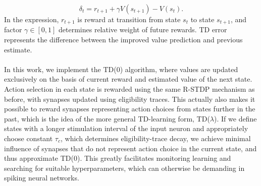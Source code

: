 \documentclass[a4paper,12pt,openright]{book}
\begin{document}
\[
\delta_t = r_{t+1} + \gamma V(s_{t+1}) - V(s_t).
\]
\noindent In the expression, \(r_{t+1}\) is reward at transition from state \(s_t\) to state \(s_{t+1}\), and factor \(\gamma \in [0,1]\) determines relative weight of future rewards. TD error represents the difference between the improved value prediction and previous estimate.
\\
\\
\noindent In this work, we implement the TD(0) algorithm, where values are updated exclusively on the basis of current reward and estimated value of the next state. Action selection in each state is rewarded using the same R-STDP mechanism as before, with synapses updated using eligibility traces. This actually also makes it possible to reward synapses representing action choices from states further in the past, which is the idea of the more general TD-learning form, TD($\lambda$). If we define states with a longer stimulation interval of the input neuron and appropriately choose constant $\tau_c$, which determines eligibility-trace decay, we achieve minimal influence of synapses that do not represent action choice in the current state, and thus approximate TD(0). This greatly facilitates monitoring learning and searching for suitable hyperparameters, which can otherwise be demanding in spiking neural networks.
\end{document}
